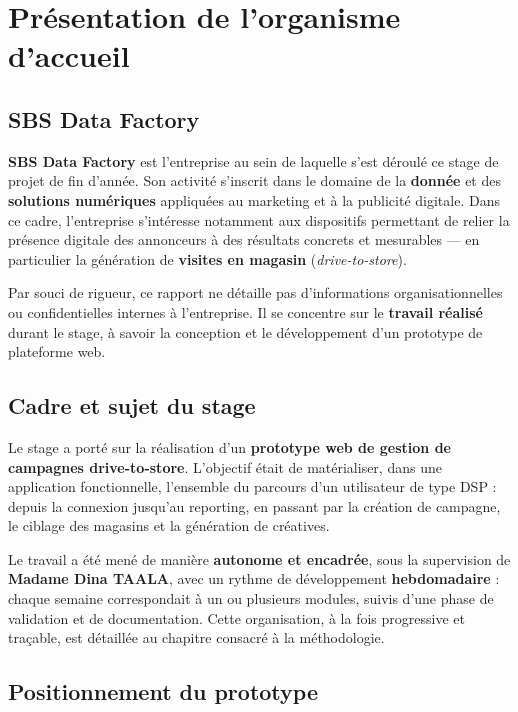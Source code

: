 \chapter{Présentation de l'organisme d'accueil}

\section{SBS Data Factory}

\textbf{SBS Data Factory} est l'entreprise au sein de laquelle s'est déroulé
ce stage de projet de fin d'année. Son activité s'inscrit dans le domaine de
la \textbf{donnée} et des \textbf{solutions numériques} appliquées au
marketing et à la publicité digitale. Dans ce cadre, l'entreprise s'intéresse
notamment aux dispositifs permettant de relier la présence digitale des
annonceurs à des résultats concrets et mesurables --- en particulier la
génération de \textbf{visites en magasin} (\emph{drive-to-store}).

Par souci de rigueur, ce rapport ne détaille pas d'informations
organisationnelles ou confidentielles internes à l'entreprise. Il se
concentre sur le \textbf{travail réalisé} durant le stage, à savoir la
conception et le développement d'un prototype de plateforme web.

\section{Cadre et sujet du stage}

Le stage a porté sur la réalisation d'un \textbf{prototype web de gestion de
campagnes drive-to-store}. L'objectif était de matérialiser, dans une
application fonctionnelle, l'ensemble du parcours d'un utilisateur de type
DSP : depuis la connexion jusqu'au reporting, en passant par la création de
campagne, le ciblage des magasins et la génération de créatives.

Le travail a été mené de manière \textbf{autonome et encadrée}, sous la
supervision de \textbf{Madame Dina TAALA}, avec un rythme de développement
\textbf{hebdomadaire} : chaque semaine correspondait à un ou plusieurs modules,
suivis d'une phase de validation et de documentation. Cette organisation, à la
fois progressive et traçable, est détaillée au chapitre consacré à la
méthodologie.

\section{Positionnement du prototype}

